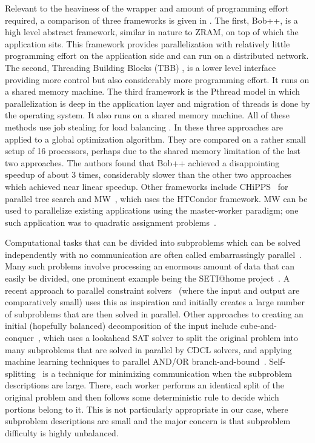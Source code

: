 \documentclass[a4paper,11pt]{article}   \usepackage{authblk} \usepackage[top=1.9cm,bottom=1.9cm,left=1.9cm,right=1.9cm]{geometry}
\newcommand{\progname}{\textsf}
\newcommand{\HTCondor}{\progname{HTCondor}\xspace}
\newcommand{\MW}{\progname{MW}\xspace}
\newcommand{\zram}{\progname{ZRAM}\xspace}
\newcommand{\tbb}{\progname{TBB}\xspace}
\newcommand{\bpp}{\progname{Bob++}\xspace}
\newcommand{\pth}{\progname{Pthread}\xspace}
\begin{document}
Relevant to the heaviness of the wrapper and amount of programming effort required,
a comparison of three frameworks is given in \cite{He17}. The first, \bpp  \cite{Dj06},
is a high level abstract framework, similar in nature to \zram, on top of which the application sits.
This framework provides parallelization with relatively little programming effort
on the application side and can run on a distributed network. 
The second, Threading Building Blocks (\tbb) \cite{Re07},
is a lower level interface providing more control but also 
considerably more programming effort. It runs on a shared memory machine. 
The third framework is the \pth model \cite{Ca08} in which parallelization
is deep in the application layer and migration of threads is done by the operating system.
It also runs on a shared memory machine.
All of these methods use job stealing for load balancing \cite{BL99}. 
In \cite{He17} these three approaches are applied to a global optimization algorithm.
They are compared on a rather small
setup of 16 processors, perhaps due to the shared memory limitation of the last two approaches. 
The authors found that \bpp achieved a disappointing speedup of about 3 times, 
considerably slower than the other two approaches
which achieved near linear speedup. 
Other frameworks include CHiPPS~\cite{YanXu07} for parallel tree search
and \MW~\cite{Goux01}, which uses the \HTCondor framework.
\MW can be used to parallelize existing applications using the master-worker paradigm; one
such application was to quadratic assignment problems~\cite{ABGL02}.


Computational tasks that can be divided into subproblems which can be solved 
independently with no communication
are often called embarrassingly parallel~\cite{WA}.  Many such problems
involve processing an enormous amount of data that can easily be divided,
one prominent example being the SETI@home project~\cite{SETI}.
A recent approach to parallel constraint solvers~\cite{MRR16} (where the
input and output are comparatively small) uses this
as inspiration and initially creates a large number of 
subproblems that are then solved in parallel.  Other approaches to
creating an initial (hopefully balanced) decomposition of the input
include 
cube-and-conquer~\cite{HKWB11},
which uses a lookahead SAT solver to split the original problem into
many subproblems that are solved in parallel by CDCL solvers, and
applying machine learning techniques to parallel AND/OR 
branch-and-bound~\cite{OD17}.  Self-splitting~\cite{FMS14} is a technique
for minimizing communication when the subproblem descriptions are large.
There, each worker performs an identical split of the original problem and
then follows some deterministic rule to decide which portions belong to it.
This is not particularly appropriate in our case, where subproblem descriptions
are small and the major concern is that subproblem difficulty is
highly unbalanced.
\end{document}
